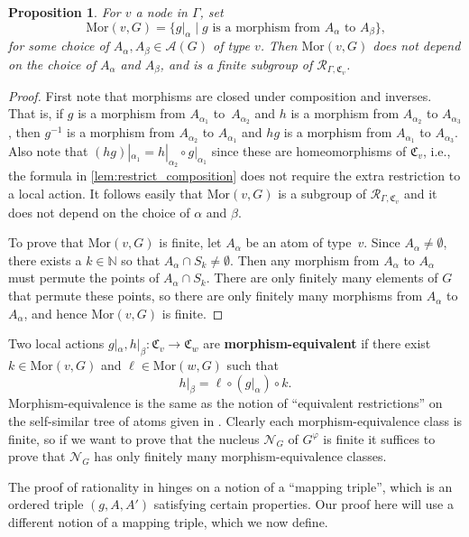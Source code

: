 \documentclass[11pt,letterpaper]{amsart}
\newtheorem{proposition}[theorem]{Proposition}
\theoremstyle{definition}
\newcommand{\newword}[1]{\textbf{#1}}
\newcommand{\N}{\mathbb{N}}
\newcommand{\R}{\mathcal{R}}
\newcommand{\Nuc}{\mathcal{N}}
\newcommand{\C}{\mathfrak{C}}
\newcommand{\A}{\mathcal{A}}
\begin{document}
\begin{proposition}\label{prop:MorphismGroups}
For $v$ a node in\/ $\Gamma$, set
\[
\mathrm{Mor}(v,G) = \bigl\{g|_\alpha \;\bigr|\; g\text{ is a morphism from $A_\alpha$ to $A_\beta$}\bigr\}\text{,}
\]
for some choice of $A_\alpha,A_\beta\in\A(G)$ of type $v$. Then\/ $\mathrm{Mor}(v,G)$ does not depend on the choice of $A_\alpha$ and $A_\beta$, and is a finite subgroup of $\R_{\Gamma,\C_v}$.
\end{proposition}
\begin{proof}
First note that morphisms are closed under composition and inverses.  That is, if $g$ is a morphism from $A_{\alpha_1}$ to~$A_{\alpha_2}$ and $h$ is a morphism from $A_{\alpha_2}$ to $A_{\alpha_3}$, then $g^{-1}$ is a morphism from $A_{\alpha_2}$ to $A_{\alpha_1}$ and $hg$ is a morphism from $A_{\alpha_1}$ to $A_{\alpha_3}$.  Also note that $(hg)|_{\alpha_1} = h|_{\alpha_2}\circ g|_{\alpha_1}$ since these are homeomorphisms of $\C_v$, i.e., the formula in \cref{lem:restrict_composition} does not require the extra restriction to a local action.  It follows easily that $\mathrm{Mor}(v,G)$ is a subgroup of $\R_{\Gamma,\C_v}$ and it does not depend on the choice of $\alpha$ and $\beta$.

To prove that $\mathrm{Mor}(v,G)$ is finite, let $A_\alpha$ be an atom of type~$v$.   Since $A_\alpha\ne\emptyset$, there exists a $k\in \N$ so that $A_\alpha\cap S_k\ne \emptyset$.  Then any morphism from $A_\alpha$ to $A_\alpha$ must permute the points of $A_\alpha\cap S_k$. There are only finitely many elements of $G$ that permute these points, so there are only finitely many morphisms from $A_\alpha$ to $A_\alpha$, and hence $\mathrm{Mor}(v,G)$ is finite.
\end{proof}

Two local actions $g|_\alpha,h|_\beta\colon \C_v\to \C_w$ are \newword{morphism-equivalent} if there exist $k\in \mathrm{Mor}(v,G)$ and $\ell\in \mathrm{Mor}(w,G)$ such that 
\[
h|_\beta = \ell\circ (g|_\alpha)\circ k.
\]
Morphism-equivalence is the same as the notion of ``equivalent restrictions'' on the self-similar tree of atoms given in \cite{BelkBleakMatucci}.  Clearly each morphism-equivalence class is finite, so if we want to prove that the nucleus $\Nuc_G$ of $G^\varphi$ is finite it suffices to prove that $\Nuc_G$ has only finitely many morphism-equivalence classes.

The proof of rationality in \cite[Section~3.6]{BelkBleakMatucci} hinges on a notion of a ``mapping triple'', which is an ordered triple $(g,A,A')$ satisfying certain properties.  Our proof here will use a different notion of a mapping triple, which we now define.
\end{document}
